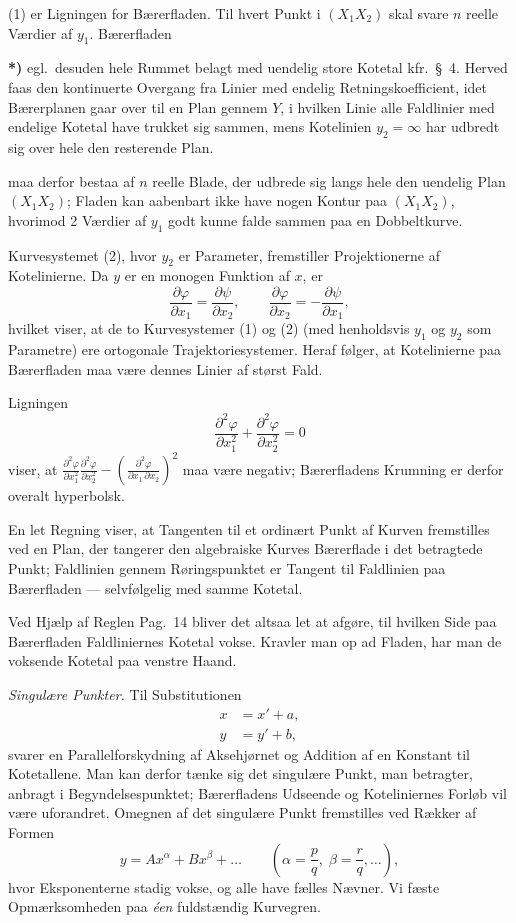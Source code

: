 \documentclass{article}
\begin{document}
(1) er Ligningen for Bærerfladen. Til hvert Punkt i $(X_1 X_2)$ skal svare $n$ reelle Værdier af $y_1$. Bærerfladen

\textbf{*)} egl.\ desuden hele Rummet belagt med uendelig store Kotetal kfr.\ §~4. Herved faas den kontinuerte Overgang fra Linier med endelig Retningskoefficient, idet Bærerplanen gaar over til en Plan gennem $Y$, i hvilken Linie alle Faldlinier med endelige Kotetal have trukket sig sammen, mens Kotelinien $y_2 = \infty$ har udbredt sig over hele den resterende Plan.

maa derfor bestaa af $n$ reelle Blade, der udbrede sig langs hele den uendelig Plan $(X_1 X_2)$; Fladen kan aabenbart ikke have nogen Kontur paa $(X_1 X_2)$, hvorimod 2 Værdier af $y_1$ godt kunne falde sammen paa en Dobbeltkurve.

Kurvesystemet (2), hvor $y_2$ er Parameter, fremstiller Projektionerne af Kotelinierne. Da $y$ er en monogen Funktion af $x$, er
\[
\frac{\partial \varphi}{\partial x_1} = \frac{\partial \psi}{\partial x_2}, \qquad
\frac{\partial \varphi}{\partial x_2} = -\frac{\partial \psi}{\partial x_1},
\]
hvilket viser, at de to Kurvesystemer (1) og (2) (med henholdsvis $y_1$ og $y_2$ som Parametre) ere ortogonale Trajektoriesystemer. Heraf følger, at Kotelinierne paa Bærerfladen maa være dennes Linier af størst Fald.

Ligningen
\[
\frac{\partial^2 \varphi}{\partial x_1^2} + \frac{\partial^2 \varphi}{\partial x_2^2} = 0
\]
viser, at $\frac{\partial^2 \varphi}{\partial x_1^2} \frac{\partial^2 \varphi}{\partial x_2^2} - \left(\frac{\partial^2 \varphi}{\partial x_1\,\partial x_2}\right)^2$ maa være negativ; Bærerfladens Krumning er derfor overalt hyperbolsk.

En let Regning viser, at Tangenten til et ordinært Punkt af Kurven fremstilles ved en Plan, der tangerer den algebraiske Kurves Bærerflade i det betragtede Punkt; Faldlinien gennem Røringspunktet er Tangent til Faldlinien paa Bærerfladen --- selvfølgelig med samme Kotetal.

Ved Hjælp af Reglen Pag.~14 bliver det altsaa let at afgøre, til hvilken Side paa Bærerfladen Faldliniernes Kotetal vokse. Kravler man op ad Fladen, har man de voksende Kotetal paa venstre Haand.

\emph{Singulære Punkter.} Til Substitutionen
\[
\begin{aligned}
x &= x' + a, \\
y &= y' + b,
\end{aligned}
\]
svarer en Parallelforskydning af Aksehjørnet og Addition af en Konstant til Kotetallene. Man kan derfor tænke sig det singulære Punkt, man betragter, anbragt i Begyndelsespunktet; Bærerfladens Udseende og Koteliniernes Forløb vil være uforandret. Omegnen af det singulære Punkt fremstilles ved Rækker af Formen
\[
y = A x^\alpha + B x^\beta + \dots \qquad \left(\alpha = \frac{p}{q}, \; \beta = \frac{r}{q}, \dots\right),
\]
hvor Eksponenterne stadig vokse, og alle have fælles Nævner. Vi fæste Opmærksomheden paa \emph{éen} fuldstændig Kurvegren.
\end{document}
